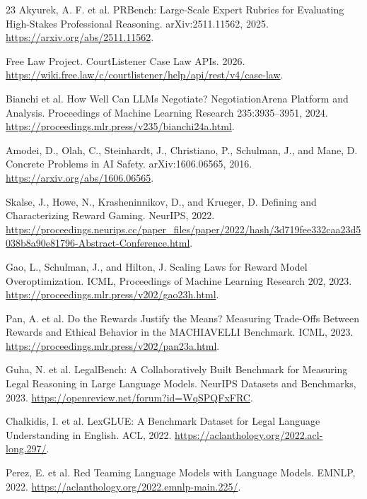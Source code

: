 \documentclass{article}
\begin{document}
\begin{thebibliography}{23}
Akyurek, A. F. et al.
PRBench: Large-Scale Expert Rubrics for Evaluating High-Stakes Professional Reasoning.
arXiv:2511.11562, 2025.
\url{https://arxiv.org/abs/2511.11562}.

Free Law Project.
CourtListener Case Law APIs.
2026.
\url{https://wiki.free.law/c/courtlistener/help/api/rest/v4/case-law}.

Bianchi et al.
How Well Can LLMs Negotiate? NegotiationArena Platform and Analysis.
Proceedings of Machine Learning Research 235:3935--3951, 2024.
\url{https://proceedings.mlr.press/v235/bianchi24a.html}.

Amodei, D., Olah, C., Steinhardt, J., Christiano, P., Schulman, J., and Mane, D.
Concrete Problems in AI Safety.
arXiv:1606.06565, 2016.
\url{https://arxiv.org/abs/1606.06565}.

Skalse, J., Howe, N., Krasheninnikov, D., and Krueger, D.
Defining and Characterizing Reward Gaming.
NeurIPS, 2022.
\url{https://proceedings.neurips.cc/paper_files/paper/2022/hash/3d719fee332caa23d5038b8a90e81796-Abstract-Conference.html}.

Gao, L., Schulman, J., and Hilton, J.
Scaling Laws for Reward Model Overoptimization.
ICML, Proceedings of Machine Learning Research 202, 2023.
\url{https://proceedings.mlr.press/v202/gao23h.html}.

Pan, A. et al.
Do the Rewards Justify the Means? Measuring Trade-Offs Between Rewards and Ethical Behavior in the MACHIAVELLI Benchmark.
ICML, 2023.
\url{https://proceedings.mlr.press/v202/pan23a.html}.

Guha, N. et al.
LegalBench: A Collaboratively Built Benchmark for Measuring Legal Reasoning in Large Language Models.
NeurIPS Datasets and Benchmarks, 2023.
\url{https://openreview.net/forum?id=WqSPQFxFRC}.

Chalkidis, I. et al.
LexGLUE: A Benchmark Dataset for Legal Language Understanding in English.
ACL, 2022.
\url{https://aclanthology.org/2022.acl-long.297/}.

Perez, E. et al.
Red Teaming Language Models with Language Models.
EMNLP, 2022.
\url{https://aclanthology.org/2022.emnlp-main.225/}.


\end{thebibliography}
\end{document}
